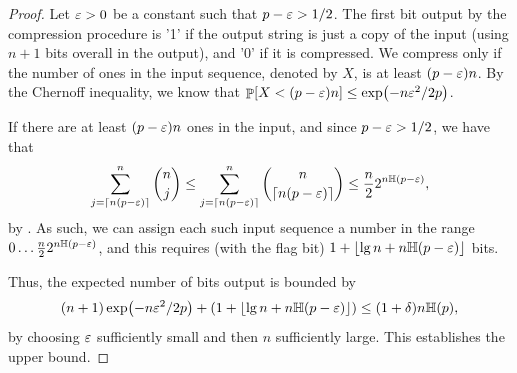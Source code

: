 \begin{proof}
    Let ${\varepsilon} > 0$ be a constant such that $p -{\varepsilon} > 1/2$. The first
    bit output by the compression procedure is '1' if the output
    string is just a copy of the input (using $n+1$ bits overall in
    the output), and '0' if it is compressed. We compress only if the
    number of ones in the input sequence, denoted by $X$, is at least
    $(p-{\varepsilon})n$. By the Chernoff inequality, we know that 
    $\Prob{X < (p-\eps)n} \leq \exp \pth{-n \eps^2/2p}$.

    If there are at least $(p-{\varepsilon})n$ ones in the input, and since
    $p-{\varepsilon}>1/2$, we have that
    \begin{equation*}
    \sum_{j=\ceil{n (p-\eps)}}^{n} \binom{n}{j} \leq 
    \sum_{j=\ceil{n (p-\eps)}}^{n} \binom{n}{\ceil{n (p-\eps)}}
    \leq \frac{n}{2} 2^{n \Entropy{p-\eps}},
    \end{equation*}
    by . As such, we can assign each such
    input sequence a number in the range $0 \ldots \frac{n}{2} 2^{n
       \Entropy{p-\eps}}$, and this requires (with the flag bit) $1 +
    \floor{\lg n + n \Entropy{p-\eps}}$ bits.
    
    Thus, the expected number of bits output is bounded by
    \begin{equation*}
    (n+1)\exp \pth{-n \eps^2/2p} + \pth{1 + \floor{\lg n + n
          \Entropy{p-\eps}}} \leq (1+\delta) n \Entropy{p},
    \end{equation*}
    by choosing ${\varepsilon}$ sufficiently small and then $n$ sufficiently
    large. This establishes the upper bound.


\end{proof}
